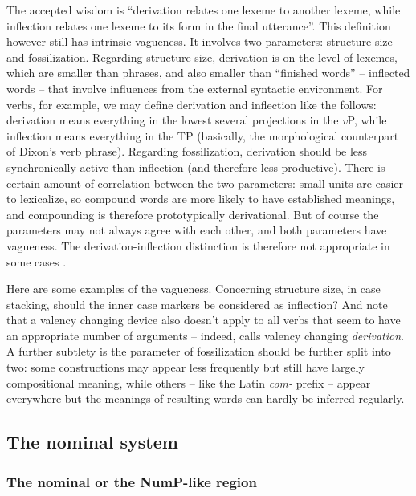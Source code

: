 \documentclass[UTF8, a4paper, oneside, scheme=plain, 12pt]{ctexbook}
\newcommand*{\citepage}[1]{p.~{#1}}
\newcommand*{\term}[1]{\emph{#1}}
\newcommand{\form}[1]{\emph{#1}}
\newcommand{\vP}{\textit{v}P}
\begin{document}
{The accepted wisdom is ``derivation relates one lexeme to another lexeme,
while inflection relates one lexeme to its form in the final utterance''.
This definition however still has intrinsic vagueness.
It involves two parameters:
structure size
and fossilization.
Regarding structure size,
derivation is on the level of lexemes,
which are smaller than phrases,
and also smaller than ``finished words'' -- inflected words -- 
that involve influences from the external syntactic environment.
For verbs, for example, we may define derivation and inflection like the follows: 
derivation means everything in the lowest several projections in the \vP,
while inflection means everything in the TP
(basically, the morphological counterpart of Dixon's verb phrase).
Regarding fossilization, 
derivation should be less synchronically active than inflection
(and therefore less productive).
There is certain amount of correlation between the two parameters:
small units are easier to lexicalize, 
so compound words are more likely to have established meanings,
and compounding is therefore prototypically derivational.
But of course the parameters may not always agree with each other,
and both parameters have vagueness.
The derivation-inflection distinction is therefore not appropriate 
in some cases \citep[\citepage{221}]{dixon2009basic1}.

Here are some examples of the vagueness.
Concerning structure size, in case stacking, 
should the inner case markers be considered as inflection?
And note that a valency changing device also doesn't apply to all verbs that seem to have 
an appropriate number of arguments --
indeed, \citet{jacques2021grammar} calls valency changing \term{derivation}.
A further subtlety is the parameter of fossilization should be further split into two:
some constructions may appear less frequently but still have largely compositional meaning,
while others -- like the Latin \form{com-} prefix -- 
appear everywhere but the meanings of resulting words
can hardly be inferred regularly.

\subsection{The nominal system}\label{sec:theory.nominal}

\subsubsection{The nominal or the NumP-like region}

}
\end{document}
